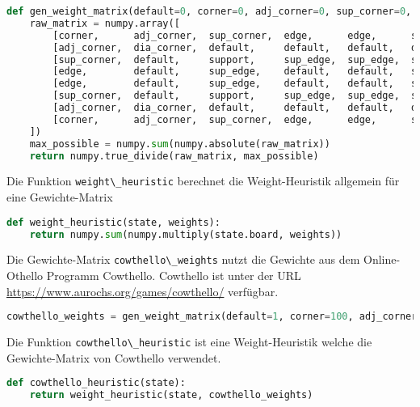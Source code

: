 \begin{lstlisting}[language=Python]
def gen_weight_matrix(default=0, corner=0, adj_corner=0, sup_corner=0, edge=0, dia_corner=0, support=0, sup_edge=0):
    raw_matrix = numpy.array([
        [corner,      adj_corner,  sup_corner,  edge,      edge,      sup_corner,  adj_corner,  corner],
        [adj_corner,  dia_corner,  default,     default,   default,   default,     dia_corner,  adj_corner],
        [sup_corner,  default,     support,     sup_edge,  sup_edge,  support,     default,     sup_corner],
        [edge,        default,     sup_edge,    default,   default,   sup_edge,    default,     edge],
        [edge,        default,     sup_edge,    default,   default,   sup_edge,    default,     edge],
        [sup_corner,  default,     support,     sup_edge,  sup_edge,  support,     default,     sup_corner],
        [adj_corner,  dia_corner,  default,     default,   default,   default,     dia_corner,  adj_corner],
        [corner,      adj_corner,  sup_corner,  edge,      edge,      sup_corner,  adj_corner,  corner]
    ])
    max_possible = numpy.sum(numpy.absolute(raw_matrix))
    return numpy.true_divide(raw_matrix, max_possible)
\end{lstlisting}

Die Funktion \passthrough{\lstinline!weight\_heuristic!} berechnet die
Weight-Heuristik allgemein für eine Gewichte-Matrix

\begin{lstlisting}[language=Python]
def weight_heuristic(state, weights):
    return numpy.sum(numpy.multiply(state.board, weights))
\end{lstlisting}

Die Gewichte-Matrix \passthrough{\lstinline!cowthello\_weights!} nutzt
die Gewichte aus dem Online-Othello Programm Cowthello. Cowthello ist
unter der URL \url{https://www.aurochs.org/games/cowthello/} verfügbar.

\begin{lstlisting}[language=Python]
cowthello_weights = gen_weight_matrix(default=1, corner=100, adj_corner=-25, sup_corner=25, edge=10, dia_corner=-50, support=50, sup_edge=5)
\end{lstlisting}

Die Funktion \passthrough{\lstinline!cowthello\_heuristic!} ist eine
Weight-Heuristik welche die Gewichte-Matrix von Cowthello verwendet.

\begin{lstlisting}[language=Python]
def cowthello_heuristic(state):
    return weight_heuristic(state, cowthello_weights)
\end{lstlisting}

